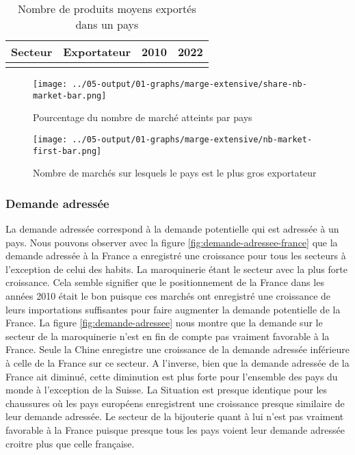 \documentclass[french,10pt,a4paper]{article}
\begin{document}
\begin{table}[ht]
  \centering
  \begin{tabular}{lrrr}
    \hline
   Secteur & Exportateur & 2010 & 2022 \\
    \hline
    \\
    \hline
  \end{tabular}
  \caption{Nombre de produits moyens exportés dans un pays}
  \label{tab:table-nb-mean-product-export}
\end{table}

\begin{figure}[!h]
  \centering
  \texttt{[image: ../05-output/01-graphs/marge-extensive/share-nb-market-bar.png]}
  \caption{Pourcentage du nombre de marché atteints par pays}
  \label{fig:nb-market-bar}
\end{figure}

\begin{figure}[!h]
  \centering  \texttt{[image: ../05-output/01-graphs/marge-extensive/nb-market-first-bar.png]}
  \caption{Nombre de marchés sur lesquels le pays est le plus gros exportateur}
  \label{fig:nb-market-first-bar}
\end{figure}


\subsubsection{Demande adressée}
La demande adressée correspond à la demande potentielle qui est adressée à un pays. Nous pouvons observer avec la figure \ref{fig:demande-adressee-france} que la demande adressée à la France a enregistré une croissance pour tous les secteurs à l'exception de celui des habits. La maroquinerie étant le secteur avec la plus forte croissance. Cela semble signifier que le positionnement de la France dans les années 2010 était le bon puisque ces marchés ont enregistré une croissance de leurs importations suffisantes pour faire augmenter la demande potentielle de la France. La figure \ref{fig:demande-adressee} nous montre que la demande sur le secteur de la maroquinerie n'est en fin de compte pas vraiment favorable à la France. Seule la Chine enregistre une croissance de la demande adressée inférieure à celle de la France sur ce secteur. A l'inverse, bien que la demande adressée de la France ait diminué, cette diminution est plus forte pour l'ensemble des pays du monde à l'exception de la Suisse. La Situation est presque identique pour les chaussures où les pays européens enregistrent une croissance presque similaire de leur demande adressée. Le secteur de la bijouterie quant à lui n'est pas vraiment favorable à la France puisque presque tous les pays voient leur demande adressée croitre plus que celle française.
\end{document}
